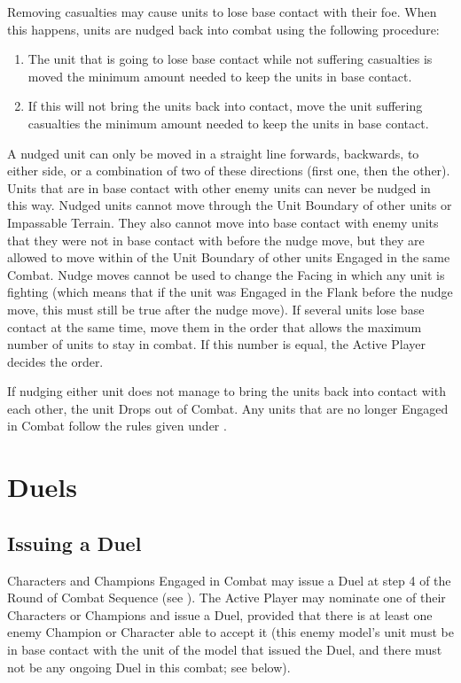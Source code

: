 Removing casualties may cause units to lose base contact with their foe. When this happens, units are nudged back into combat using the following procedure:
\begin{enumerate}
\item The unit that is going to lose base contact while not suffering casualties is moved the minimum amount needed to keep the units in base contact.
\item If this will not bring the units back into contact, move the unit suffering casualties the minimum amount needed to keep the units in base contact.
\end{enumerate}
A nudged unit can only be moved in a straight line forwards, backwards, to either side, or a combination of two of these directions (first one, then the other). Units that are in base contact with other enemy units can never be nudged in this way. Nudged units cannot move through the Unit Boundary of other units or Impassable Terrain. They also cannot move into base contact with enemy units that they were not in base contact with before the nudge move, but they are allowed to move within  of the Unit Boundary of other units Engaged in the same Combat. Nudge moves cannot be used to change the Facing in which any unit is fighting (which means that if the unit was Engaged in the Flank before the nudge move, this must still be true after the nudge move). If several units lose base contact at the same time, move them in the order that allows the maximum number of units to stay in combat. If this number is equal, the Active Player decides the order.\par

If nudging either unit does not manage to bring the units back into contact with each other, the unit Drops out of Combat. Any units that are no longer Engaged in Combat follow the rules given under .
\par

\section{Duels}
\label{duels}

\subsection{Issuing a Duel}
\label{issuing_a_duel}

Characters and Champions Engaged in Combat may issue a Duel at step 4 of the Round of Combat Sequence (see ). The Active Player may nominate one of their Characters or Champions and issue a Duel, provided that there is at least one enemy Champion or Character able to accept it (this enemy model's unit must be in base contact with the unit of the model that issued the Duel, and there must not be any ongoing Duel in this combat; see below).

